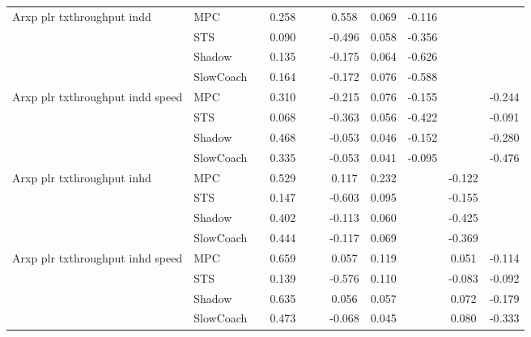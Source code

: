 \begin{tabular}{|l|l|*{9}{c|}}
\midrule
Arxp plr txthroughput indd    & MPC &       &     0.258 &        &     &  0.558 &  0.069 &  -0.116 &      &       \\
                              & STS &       &     0.090 &        &     & -0.496 &  0.058 &  -0.356 &      &       \\
                              & Shadow &       &     0.135 &        &     & -0.175 &  0.064 &  -0.626 &      &       \\
                              & SlowCoach &       &     0.164 &        &     & -0.172 &  0.076 &  -0.588 &      &       \\
\midrule
Arxp plr txthroughput indd speed    & MPC &       &     0.310 &        &     & -0.215 &  0.076 &  -0.155 &      &   -0.244 \\
                              & STS &       &     0.068 &        &     & -0.363 &  0.056 &  -0.422 &      &   -0.091 \\
                              & Shadow &       &     0.468 &        &     & -0.053 &  0.046 &  -0.152 &      &   -0.280 \\
                              & SlowCoach &       &     0.335 &        &     & -0.053 &  0.041 &  -0.095 &      &   -0.476 \\
\midrule
Arxp plr txthroughput inhd    & MPC &       &     0.529 &        &     &  0.117 &  0.232 &      &  -0.122 &       \\
                              & STS &       &     0.147 &        &     & -0.603 &  0.095 &      &  -0.155 &       \\
                              & Shadow &       &     0.402 &        &     & -0.113 &  0.060 &      &  -0.425 &       \\
                              & SlowCoach &       &     0.444 &        &     & -0.117 &  0.069 &      &  -0.369 &       \\
\midrule
Arxp plr txthroughput inhd speed    & MPC &       &     0.659 &        &     &  0.057 &  0.119 &      &   0.051 &   -0.114 \\
                              & STS &       &     0.139 &        &     & -0.576 &  0.110 &      &  -0.083 &   -0.092 \\
                              & Shadow &       &     0.635 &        &     &  0.056 &  0.057 &      &   0.072 &   -0.179 \\
                              & SlowCoach &       &     0.473 &        &     & -0.068 &  0.045 &      &   0.080 &   -0.333 \\

\end{tabular}
